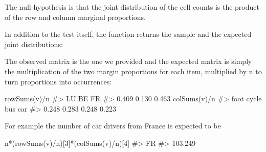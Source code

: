 \documentclass[
  letterpaper,
  DIV=11,
  numbers=noendperiod]{scrreprt}
\newenvironment{Shaded}{\begin{snugshade}}{\end{snugshade}}
\newcommand{\CommentTok}[1]{\textcolor[rgb]{0.37,0.37,0.37}{#1}}
\newcommand{\DecValTok}[1]{\textcolor[rgb]{0.68,0.00,0.00}{#1}}
\newcommand{\FunctionTok}[1]{\textcolor[rgb]{0.28,0.35,0.67}{#1}}
\newcommand{\NormalTok}[1]{\textcolor[rgb]{0.00,0.23,0.31}{#1}}
\newcommand{\OtherTok}[1]{\textcolor[rgb]{0.00,0.23,0.31}{#1}}
\newcommand{\SpecialCharTok}[1]{\textcolor[rgb]{0.37,0.37,0.37}{#1}}
\begin{document}
The null hypothesis is that the joint distribution of the cell counts is
the product of the row and column marginal proportions.

In addition to the test itself, the function returns the sample and the
expected joint distributions:

\begin{Shaded}
\end{Shaded}

The observed matrix is the one we provided and the expected matrix is
simply the multiplication of the two margin proportions for each item,
multiplied by n to turn proportions into occurrences:

\begin{Shaded}
\begin{Highlighting}[]
\FunctionTok{rowSums}\NormalTok{(v)}\SpecialCharTok{/}\NormalTok{n}
\CommentTok{\#\textgreater{}    LU    BE    FR }
\CommentTok{\#\textgreater{} 0.409 0.130 0.463}
\FunctionTok{colSums}\NormalTok{(v)}\SpecialCharTok{/}\NormalTok{n}
\CommentTok{\#\textgreater{}  foot cycle   bus   car }
\CommentTok{\#\textgreater{} 0.248 0.283 0.248 0.223}
\end{Highlighting}
\end{Shaded}

For example the number of car drivers from France is expected to be

\begin{Shaded}
\begin{Highlighting}[]
\NormalTok{n}\SpecialCharTok{*}\NormalTok{(}\FunctionTok{rowSums}\NormalTok{(v)}\SpecialCharTok{/}\NormalTok{n)[}\DecValTok{3}\NormalTok{]}\SpecialCharTok{*}\NormalTok{(}\FunctionTok{colSums}\NormalTok{(v)}\SpecialCharTok{/}\NormalTok{n)[}\DecValTok{4}\NormalTok{]}
\CommentTok{\#\textgreater{}      FR }
\CommentTok{\#\textgreater{} 103.249}
\end{Highlighting}
\end{Shaded}
\end{document}
